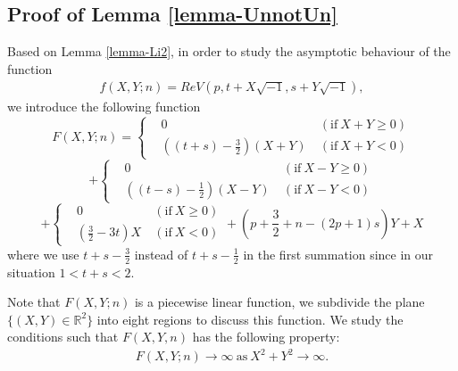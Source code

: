 \documentclass[12pt]{amsart}
\begin{document}
\subsection{Proof of Lemma \ref{lemma-UnnotUn}} \label{appendix-LemmaUn}

Based on Lemma \ref{lemma-Li2}, in order to study the asymptotic behaviour of the function 
\begin{align}
    f(X,Y;n)=ReV(p,t+X\sqrt{-1},s+Y\sqrt{-1}), 
\end{align}
we introduce the following  function
\begin{equation} \label{eq:2}
F(X,Y;n)=\left\{ \begin{aligned}
         &0  &  \ (\text{if} \ X+Y\geq 0) \\
         &\left((t+s)-\frac{3}{2}\right)(X+Y) & \ (\text{if} \ X+Y<0)
                          \end{aligned} \right.
                          \end{equation}
\begin{equation*}
 +\left\{ \begin{aligned}
         &0  &  \ (\text{if} \ X-Y\geq 0) \\
         &\left((t-s)-\frac{1}{2}\right)(X-Y) & \ (\text{if} \ X-Y<0)
                          \end{aligned} \right.
                          \end{equation*}
\begin{equation*}
+\left\{ \begin{aligned}
         &0  &  \ (\text{if} \ X\geq 0) \\
         &\left(\frac{3}{2}-3t\right)X & \ (\text{if} \ X<0)
                          \end{aligned} \right.  +\left(p+\frac{3}{2}+n-(2p+1)s\right)Y+X
                          \end{equation*}
where we use $t+s-\frac{3}{2}$ instead of $t+s-\frac{1}{2}$ in the first summation since in our situation $1< t+s<2$.                       


  Note that $F(X,Y;n)$ is a piecewise linear function,  we subdivide the plane $\{(X,Y)\in \mathbb{R}^2\}$ into eight regions to discuss this function. We study the conditions such that $F(X,Y,n)$ has the following property: 
\begin{align} \label{formula-F(X,Y)2}
    F(X,Y;n)\rightarrow \infty \ \text{as} \ X^2+Y^2\rightarrow \infty.
\end{align}
\end{document}
